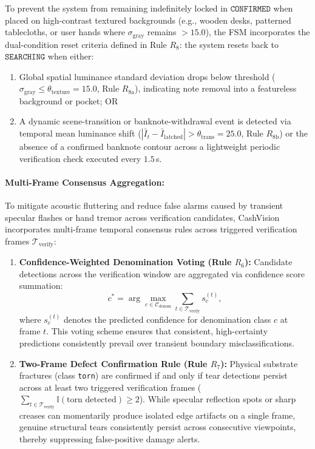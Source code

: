 \documentclass[final,5p,times,twocolumn,authoryear]{elsarticle}
\begin{document}
\begin{itemize}
    To prevent the system from remaining indefinitely locked in $\texttt{CONFIRMED}$ when placed on high-contrast textured backgrounds (e.g., wooden desks, patterned tablecloths, or user hands where $\sigma_{\text{gray}}$ remains $> 15.0$), the FSM incorporates the dual-condition reset criteria defined in Rule $R_8$: the system resets back to $\texttt{SEARCHING}$ when either:
    \begin{enumerate}[label=(\alph*)]
        \item Global spatial luminance standard deviation drops below threshold ($\sigma_{\text{gray}} \le \theta_{\text{texture}} = 15.0$, Rule $R_{8\text{a}}$), indicating note removal into a featureless background or pocket; OR
        \item A dynamic scene-transition or banknote-withdrawal event is detected via temporal mean luminance shift ($|\bar{I}_t - \bar{I}_{\text{latched}}| > \theta_{\text{trans}} = 25.0$, Rule $R_{8\text{b}}$) or the absence of a confirmed banknote contour across a lightweight periodic verification check executed every $1.5$\,s.
    \end{enumerate}
\end{itemize}

\paragraph{Multi-Frame Consensus Aggregation:}
To mitigate acoustic fluttering and reduce false alarms caused by transient specular flashes or hand tremor across verification candidates, CashVision incorporates multi-frame temporal consensus rules across triggered verification frames $\mathcal{T}_{\text{verify}}$:
\begin{enumerate}[label=(\alph*)]
    \item \textbf{Confidence-Weighted Denomination Voting (Rule $R_6$):} Candidate detections across the verification window are aggregated via confidence score summation:
    \begin{equation}
    c^* = \arg\max_{c \in \mathcal{C}_{\text{denom}}} \sum_{t \in \mathcal{T}_{\text{verify}}} s_c^{(t)},
    \end{equation}
    where $s_c^{(t)}$ denotes the predicted confidence for denomination class $c$ at frame $t$. This voting scheme ensures that consistent, high-certainty predictions consistently prevail over transient boundary misclassifications.
    \item \textbf{Two-Frame Defect Confirmation Rule (Rule $R_7$):} Physical substrate fractures (class \texttt{torn}) are confirmed if and only if tear detections persist across at least two triggered verification frames ($\sum_{t \in \mathcal{T}_{\text{verify}}} \mathbb{I}(\text{torn detected}) \ge 2$). While specular reflection spots or sharp creases can momentarily produce isolated edge artifacts on a single frame, genuine structural tears consistently persist across consecutive viewpoints, thereby suppressing false-positive damage alerts.
\end{enumerate}
\end{document}
